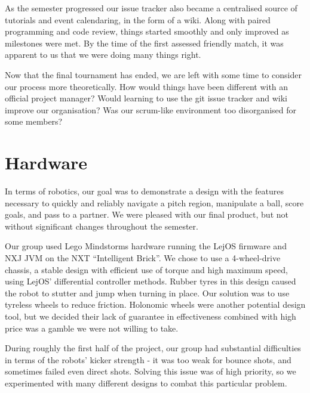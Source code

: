 \documentclass[a4paper,11pt]{article}
\begin{document}
As the semester progressed our issue tracker also became a centralised source of tutorials and event calendaring, in the form of a wiki. Along with paired programming and code review, things started smoothly and only improved as milestones were met. By the time of the first assessed friendly match, it was apparent to us that we were doing many things right.

Now that the final tournament has ended, we are left with some time to consider our process more theoretically. How would things have been different with an official project manager? Would learning to use the git issue tracker and wiki improve our organisation? Was our scrum-like environment too disorganised for some members?




\section{Hardware}

In terms of robotics, our goal was to demonstrate a design with the features necessary to quickly and reliably navigate a pitch region, manipulate a ball, score goals, and pass to a partner. We were pleased with our final product, but not without significant changes throughout the semester.

Our group used Lego Mindstorms hardware running the LejOS firmware and NXJ JVM  on the NXT “Intelligent Brick”. We chose to use a 4-wheel-drive chassis, a stable design with efficient use of torque and high maximum speed, using LejOS’ differential controller methods. Rubber tyres in this design caused the robot to stutter and jump when turning in place. Our solution was to use tyreless wheels to reduce friction. Holonomic wheels were another potential design tool, but we decided their lack of guarantee in effectiveness combined with high price was a gamble we were not willing to take.

During roughly the first half of the project, our group had substantial difficulties in terms of the robots’ kicker strength - it was too weak for bounce shots, and sometimes failed even direct shots. Solving this issue was of high priority, so we experimented with many different designs to combat this particular problem. 
\end{document}
